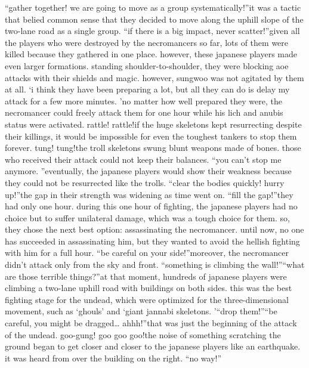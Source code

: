 “gather together! we are going to move as a group systematically!”it was a tactic that belied common sense that they decided to move along the uphill slope of the two-lane road as a single group.
“if there is a big impact, never scatter!”given all the players who were destroyed by the necromancers so far, lots of them were killed because they gathered in one place.
however, these japanese players made even larger formations.
 standing shoulder-to-shoulder, they were blocking aoe attacks with their shields and magic.
however, sungwoo was not agitated by them at all.
‘i think they have been preparing a lot, but all they can do is delay my attack for a few more minutes.
’no matter how well prepared they were, the necromancer could freely attack them for one hour while his lich and anubis status were activated.
rattle! rattle!if the huge skeletons kept resurrecting despite their killings, it would be impossible for even the toughest tankers to stop them forever.
tung! tung!the troll skeletons swung blunt weapons made of bones.
 those who received their attack could not keep their balances.
“you can’t stop me anymore.
”eventually, the japanese players would show their weakness because they could not be resurrected like the trolls.
“clear the bodies quickly! hurry up!”the gap in their strength was widening as time went on.
“fill the gap!”they had only one hour.
 during this one hour of fighting, the japanese players had no choice but to suffer unilateral damage, which was a tough choice for them.
so, they chose the next best option: assassinating the necromancer.
until now, no one has succeeded in assassinating him, but they wanted to avoid the hellish fighting with him for a full hour.
“be careful on your side!”moreover, the necromancer didn’t attack only from the sky and front.
“something is climbing the wall!”“what are those terrible things?”at that moment, hundreds of japanese players were climbing a two-lane uphill road with buildings on both sides.
 this was the best fighting stage for the undead, which were optimized for the three-dimensional movement, such as ‘ghouls’ and ‘giant jannabi skeletons.
’“drop them!”“be careful, you might be dragged… ahhh!”that was just the beginning of the attack of the undead.
goo-gung! goo goo goo!the noise of something scratching the ground began to get closer and closer to the japanese players like an earthquake.
 it was heard from over the building on the right.
“no way!”

